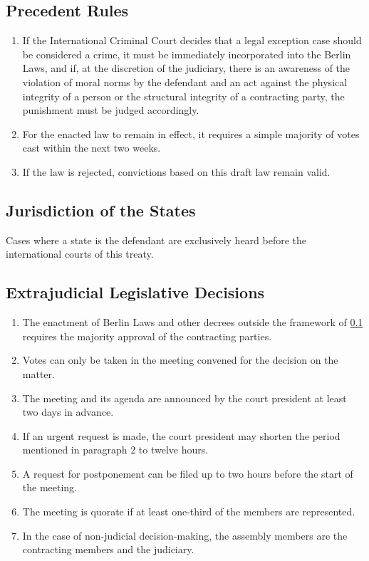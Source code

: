 \documentclass{article}
\begin{document}
\subsection{Precedent Rules}\label{prec}
\begin{enumerate}[(1)]
    \item If the International Criminal Court decides that a legal exception case should be considered a crime, it must be immediately incorporated into the Berlin Laws, and if, at the discretion of the judiciary, there is an awareness of the violation of moral norms by the defendant and an act against the physical integrity of a person or the structural integrity of a contracting party, the punishment must be judged accordingly.
    \item For the enacted law to remain in effect, it requires a simple majority of votes cast within the next two weeks.
    \item If the law is rejected, convictions based on this draft law remain valid.
\end{enumerate}

\subsection{Jurisdiction of the States}
Cases where a state is the defendant are exclusively heard before the international courts of this treaty.

\subsection{Extrajudicial Legislative Decisions}
\begin{enumerate}[(1)]
    \item The enactment of Berlin Laws and other decrees outside the framework of \ref{prec} requires the majority approval of the contracting parties.
    \item Votes can only be taken in the meeting convened for the decision on the matter.
    \item The meeting and its agenda are announced by the court president at least two days in advance.
    \item If an urgent request is made, the court president may shorten the period mentioned in paragraph 2 to twelve hours.
    \item A request for postponement can be filed up to two hours before the start of the meeting.
    \item The meeting is quorate if at least one-third of the members are represented.
    \item In the case of non-judicial decision-making, the assembly members are the contracting members and the judiciary.
\end{enumerate}
\end{document}
